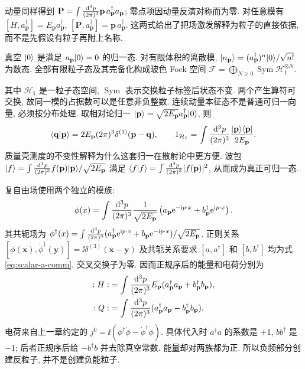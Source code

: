 动量同样得到 $\mathbf P=\int\frac{\mathrm d^3p}{(2\pi)^3}\mathbf p\,a^\dagger_{\mathbf p}a_{\mathbf p}$; 零点项因动量反演对称而为零. 对任意模有 $[H,a^\dagger_{\mathbf p}]=E_{\mathbf p}a^\dagger_{\mathbf p}$, $[\mathbf P,a^\dagger_{\mathbf p}]=\mathbf p\,a^\dagger_{\mathbf p}$. 这两式给出了把场激发解释为粒子的直接依据, 而不是先假设有粒子再附上名称.

\begin{definition}
真空 $\lvert 0\rangle$ 是满足 $a_{\mathbf p}\lvert 0\rangle=0$ 的归一态. 对有限体积的离散模, $\lvert n_{\mathbf p}\rangle=(a^\dagger_{\mathbf p})^n\lvert 0\rangle/\sqrt{n!}$ 为数态. 全部有限粒子态及其完备化构成玻色 Fock 空间 $\mathcal F=\bigoplus_{N\ge0}\operatorname{Sym}\mathcal H_1^{\otimes N}$.
\end{definition}
其中 $\mathcal H_1$ 是一粒子态空间, $\operatorname{Sym}$ 表示交换粒子标签后状态不变. 两个产生算符可交换, 故同一模的占据数可以是任意非负整数. 连续动量本征态不是普通可归一向量, 必须按分布处理. 取相对论归一 $\lvert \mathbf p\rangle=\sqrt{2E_{\mathbf p}}a^\dagger_{\mathbf p}\lvert 0\rangle$, 则
\[
\langle \mathbf q\vert \mathbf p\rangle=2E_{\mathbf p}(2\pi)^3\delta^{(3)}(\mathbf p-\mathbf q),\qquad
1_{\mathcal H_1}=\int\frac{\mathrm d^3p}{(2\pi)^3}\frac{\lvert \mathbf p\rangle\langle \mathbf p\rvert}{2E_{\mathbf p}}.
\]
质量壳测度的不变性解释为什么这套归一在散射论中更方便. 波包 $\lvert f\rangle=\int\frac{\mathrm d^3p}{(2\pi)^3} f(\mathbf p)\lvert \mathbf p\rangle/\sqrt{2E_{\mathbf p}}$ 满足 $\langle f|f\rangle=\int\frac{\mathrm d^3p}{(2\pi)^3}|f(\mathbf p)|^2$, 从而成为真正可归一态.

复自由场使用两个独立的模族:
\begin{equation}\label{eq:complex-mode}
\phi(x)=\int\frac{\mathrm d^3p}{(2\pi)^3}\frac1{\sqrt{2E_{\mathbf p}}}
\left(a_{\mathbf p}\mathrm e^{-\mathrm i p\cdot x}+b^\dagger_{\mathbf p}\mathrm e^{\mathrm i p\cdot x}\right).
\end{equation}
其共轭场为 $\phi^\dagger(x)=\int\frac{\mathrm d^3p}{(2\pi)^3}(a^\dagger_{\mathbf p}\mathrm e^{\mathrm i p\cdot x}+b_{\mathbf p}\mathrm e^{-\mathrm i p\cdot x})/\sqrt{2E_{\mathbf p}}$. 正则关系 $[\phi(\mathbf x),\dot\phi^\dagger(\mathbf y)]=\ii\delta^{(3)}(\mathbf x-\mathbf y)$ 及共轭关系要求 $[a,a^\dagger]$ 和 $[b,b^\dagger]$ 均为式\eqref{eq:scalar-a-comm}, 交叉交换子为零. 因而正规序后的能量和电荷分别为
\begin{align*}
:H:&=\int\frac{\mathrm d^3p}{(2\pi)^3} E_{\mathbf p}(a^\dagger_{\mathbf p}a_{\mathbf p}+b^\dagger_{\mathbf p}b_{\mathbf p}),\\
:Q:&=\int\frac{\mathrm d^3p}{(2\pi)^3}(a^\dagger_{\mathbf p}a_{\mathbf p}-b^\dagger_{\mathbf p}b_{\mathbf p}).
\end{align*}
电荷来自上一章约定的 $j^0=\ii(\phi^\dagger\dot\phi-\dot\phi^\dagger\phi)$. 具体代入时 $a^\dagger a$ 的系数是 $+1$, $bb^\dagger$ 是 $-1$; 后者正规序后给 $-b^\dagger b$ 并去除真空常数. 能量却对两族都为正. 所以负频部分创建反粒子, 并不是创建负能粒子.

